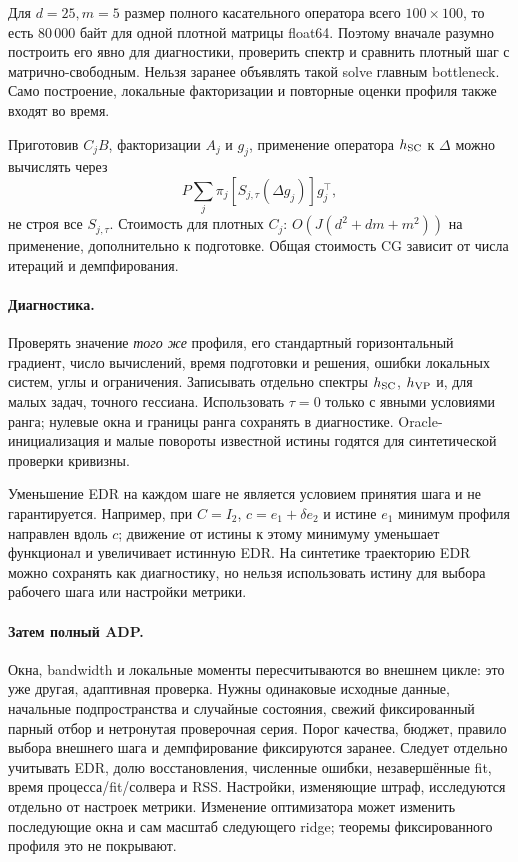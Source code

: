 \documentclass[11pt,a4paper]{article}
\theoremstyle{remark}
\begin{document}
Для $d=25,m=5$ размер полного касательного оператора всего $100\times100$,
то есть $80\,000$ байт для одной плотной матрицы float64. Поэтому вначале
разумно построить его явно для диагностики, проверить спектр и сравнить
плотный шаг с матрично-свободным. Нельзя заранее объявлять такой solve
главным bottleneck. Само построение, локальные факторизации и повторные
оценки профиля также входят во время.

Приготовив $C_jB$, факторизации $A_j$ и $g_j$, применение оператора
$h_{\rm SC}$ к $\Delta$ можно вычислять через
\[
 P\sum_j\pi_j[S_{j,\tau}(\Delta g_j)]g_j^\top,
\]
не строя все $S_{j,\tau}$. Стоимость для плотных $C_j$:
$O(J(d^2+dm+m^2))$ на применение, дополнительно к подготовке.
Общая стоимость CG зависит от числа итераций и демпфирования.

\paragraph{Диагностика.}
Проверять значение \emph{того же} профиля, его стандартный горизонтальный
градиент, число вычислений, время подготовки и решения, ошибки локальных
систем, углы и ограничения. Записывать отдельно спектры $h_{\rm SC}$,
$h_{\rm VP}$ и, для малых задач, точного гессиана. Использовать $\tau=0$
только с явными условиями ранга; нулевые окна и границы ранга сохранять
в диагностике. Oracle-инициализация и малые повороты известной истины
годятся для синтетической проверки кривизны.

Уменьшение EDR на каждом шаге не является условием принятия шага и не
гарантируется. Например, при $C=I_2$, $c=e_1+\delta e_2$ и истине
$e_1$ минимум профиля направлен вдоль $c$; движение от истины к этому
минимуму уменьшает функционал и увеличивает истинную EDR.
На синтетике траекторию EDR можно сохранять как диагностику, но нельзя
использовать истину для выбора рабочего шага или настройки метрики.

\paragraph{Затем полный ADP.}
Окна, bandwidth и локальные моменты пересчитываются во внешнем цикле:
это уже другая, адаптивная проверка. Нужны одинаковые исходные данные,
начальные подпространства и случайные состояния, свежий фиксированный
парный отбор и нетронутая проверочная серия. Порог качества, бюджет,
правило выбора внешнего шага и демпфирование фиксируются заранее.
Следует отдельно учитывать EDR, долю восстановления, численные ошибки,
незавершённые fit, время процесса/fit/солвера и RSS. Настройки, изменяющие
штраф, исследуются отдельно от настроек метрики.
Изменение оптимизатора может изменить последующие окна и сам масштаб
следующего ridge; теоремы фиксированного профиля это не покрывают.
\end{document}
